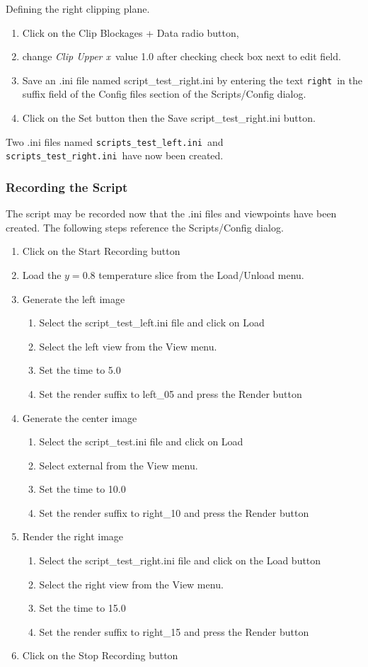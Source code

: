 \documentclass[11pt,twoside]{book}
\begin{document}
Defining the right clipping plane.
\begin{enumerate}
\item Click on the Clip Blockages + Data radio button,
\item change {\em Clip Upper x}\ value 1.0 after checking check box next to edit field.
\item Save an .ini file named script\_test\_right.ini by entering the text
{\tt right}\ in the suffix field of the Config files section of the Scripts/Config dialog.
\item Click on the Set button then the Save script\_test\_right.ini button.
\end{enumerate}

Two .ini files named {\tt scripts\_test\_left.ini}\
and {\tt scripts\_test\_right.ini}\ have
now been created.
\subsubsection{Recording the Script}
The script may be recorded now that the .ini files and viewpoints have been created.  The following steps reference the Scripts/Config dialog.

\begin{enumerate}
\item Click on the Start Recording button
\item Load the $y=0.8$ temperature slice from the Load/Unload menu.
\item Generate the left image
\begin{enumerate}
\item Select the script\_test\_left.ini file and click on Load
\item Select the left view from the View menu.
\item Set the time to 5.0
\item Set the render suffix to left\_05 and press the Render button
\end{enumerate}
\item Generate the center image
\begin{enumerate}
\item Select the script\_test.ini file and click on Load
\item Select external from the View menu.
\item Set the time to 10.0
\item Set the render suffix to right\_10 and press the Render button
\end{enumerate}
\item Render the right image
\begin{enumerate}
\item Select the script\_test\_right.ini file and click on the Load button
\item Select the right view from the View menu.
\item Set the time to 15.0
\item Set the render suffix to right\_15 and press the Render button
\end{enumerate}
\item Click on the Stop Recording button
\end{enumerate}
\end{document}
